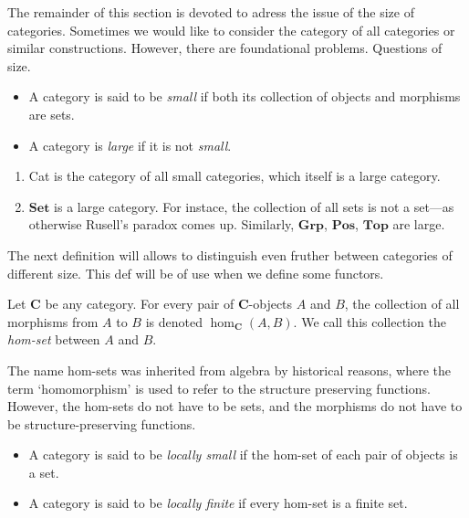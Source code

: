 The remainder of this section is devoted to adress the issue of the size of categories.
Sometimes we would like to consider the category of all categories
or similar constructions. However, 
there are foundational problems.
Questions of size.

\begin{definition}
\begin{itemize}[left=0pt]
    \item A category is said to be \textit{small} if both its collection of objects and morphisms are sets.
    \item A category is  \textit{large} if it is not \textit{small}.
\end{itemize}    
\end{definition}

\begin{example}
\begin{enumerate}[label=(\alph*)]
    \item Cat is the category of all small categories, which itself is a large category.
    \item \(\mathbf{Set}\) is a large category. For instace, the collection of all sets is not a set---as otherwise Rusell's paradox comes up. Similarly, \(\mathbf{Grp}\), \(\mathbf{Pos}\), \(\mathbf{Top}\) are large.
\end{enumerate}
\end{example}


The next definition will allows to distinguish even fruther between categories of different size.
This def will be of use when we define some functors.

\begin{definition}
    Let \(\mathbf{C}\) be any category.
    For every pair of \(\mathbf{C}\)-objects \(A\) and \(B\), the collection of all morphisms from \(A\) to \(B\) is denoted \(\hom_\mathbf{C}(A,B)\).
    We call this collection the  \textit{hom-set} between \(A\) and \(B\).
\end{definition}

\begin{remark}
    The name hom-sets was inherited from algebra by historical reasons, where the term `homomorphism' is used to refer to the structure preserving functions. 
    However, the hom-sets do not have to be sets, and the morphisms do not have to be structure-preserving functions.
\end{remark}

\begin{definition}
    \begin{itemize}[left=0pt]
        \item A category is said to be \textit{locally small} if the hom-set of  each pair of objects is a set.
        \item A category is said to be \textit{locally finite} if every  hom-set is a finite set.
    \end{itemize}    
\end{definition}

